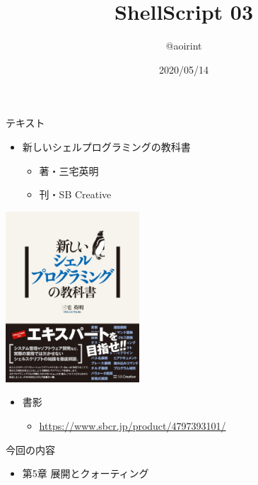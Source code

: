 \documentclass[12pt,aspectratio=169]{beamer}
\title{ShellScript 03}
\author{@aoirint}
\date{2020/05/14}
\begin{document}
\frame{\maketitle}

\begin{frame}{テキスト}

  \begin{minipage}{0.58\textwidth}
    \begin{itemize}
      \item 新しいシェルプログラミングの教科書
      \begin{itemize}
        \item 著・三宅英明
        \item 刊・SB Creative
      \end{itemize}
    \end{itemize}
  \end{minipage}
  \hfill
  \begin{minipage}{0.38\textwidth}
    \vspace{-4\baselineskip}
    \begin{center}
      \includegraphics[width=5cm,bb=0 0 467 596]{../01/images/shellbook.jpg}
    \end{center}
  \end{minipage}

  \begin{itemize}
    \item 書影
    \begin{itemize}
      \item { \small \url{https://www.sbcr.jp/product/4797393101/} }
    \end{itemize}
  \end{itemize}

\end{frame}


\begin{frame}{今回の内容}

  \begin{itemize}
    \item 第5章 展開とクォーティング
  \end{itemize}

\end{frame}
\end{document}
